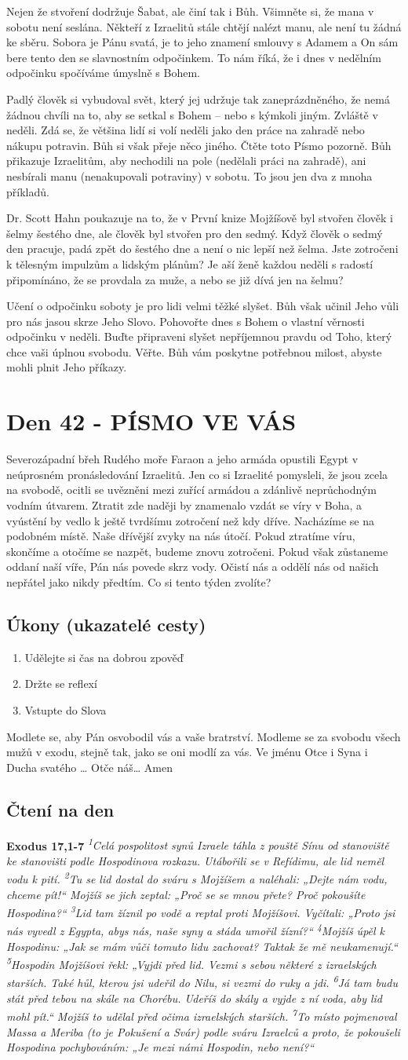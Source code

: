 \documentclass[11pt]{article}
\newcommand{\zacatekSestyTyden}{
  Severozápadní břeh Rudého moře \newline 
  Faraon a jeho armáda opustili Egypt v neúprosném pronásledování Izraelitů. Jen co si Izraelité pomysleli, že jsou zcela na svobodě, ocitli se uvězněni mezi zuřící armádou a zdánlivě neprůchodným vodním útvarem. Ztratit zde naději by znamenalo vzdát se víry v Boha, a vyústění by vedlo k ještě tvrdšímu zotročení než kdy dříve. Nacházíme se na podobném místě. Naše dřívější zvyky na nás útočí. Pokud ztratíme víru, skončíme a otočíme se nazpět, budeme znovu zotročeni. Pokud však zůstaneme oddaní naší víře, Pán nás povede skrz vody. Očistí nás a oddělí nás od našich nepřátel jako nikdy předtím. Co si tento týden zvolíte?

\subsection*{Úkony (ukazatelé cesty)}
\begin{enumerate}
  \item Udělejte si čas na dobrou zpověď
  \item Držte se reflexí
  \item Vstupte do Slova
\end{enumerate}
Modlete se, aby Pán osvobodil vás a vaše bratrství. \newline
Modleme se za svobodu všech mužů v exodu, stejně tak, jako se oni modlí za vás.\newline
Ve jménu Otce i Syna i Ducha svatého …  Otče náš… Amen
}
\begin{document}
Nejen že stvoření dodržuje Šabat, ale činí tak i Bůh. Všimněte si, že mana v sobotu není seslána. Někteří z Izraelitů
stále chtějí nalézt manu, ale není tu žádná ke sběru. Sobora je Pánu svatá, je to jeho znamení smlouvy s Adamem a On
sám bere tento den se slavnostním odpočinkem. To nám říká, že i dnes v nedělním odpočinku spočíváme úmyslně
s Bohem.

Padlý člověk si vybudoval svět, který jej udržuje tak zaneprázdněného, že nemá žádnou chvíli na to, aby se setkal
s Bohem – nebo s kýmkoli jiným. Zvláště v neděli. Zdá se, že většina lidí si volí neděli jako den práce na zahradě nebo
nákupu potravin. Bůh si však přeje něco jiného. Čtěte toto Písmo pozorně. Bůh přikazuje Izraelitům, aby nechodili na
pole (nedělali práci na zahradě), ani nesbírali manu (nenakupovali potraviny) v sobotu. To jsou jen dva z mnoha
příkladů.

Dr. Scott Hahn poukazuje na to, že v První knize Mojžíšově byl stvořen člověk i šelmy šestého dne, ale člověk byl
stvořen pro den sedmý. Když člověk o sedmý den pracuje, padá zpět do šestého dne a není o nic lepší než šelma. Jste
zotročeni k tělesným impulzům a lidským plánům? Je aší ženě každou neděli s radostí připomínáno, že se provdala za
muže, a nebo se již dívá jen na šelmu?

Učení o odpočinku soboty je pro lidi velmi těžké slyšet. Bůh však učinil Jeho vůli pro nás jasou skrze Jeho Slovo.
Pohovořte dnes s Bohem o vlastní věrnosti odpočinku v neděli. Buďte připraveni slyšet nepříjemnou pravdu od Toho,
který chce vaši úplnou svobodu. Věřte. Bůh vám poskytne potřebnou milost, abyste mohli plnit Jeho příkazy.


\newpage
\section{Den 42 - PÍSMO VE VÁS}
\zacatekSestyTyden
\subsection*{Čtení na den}
\textbf{Exodus 17,1-7}
\newline
\textit{
\textsuperscript{1}Celá pospolitost synů Izraele táhla z pouště Sínu od stanoviště ke stanovišti podle Hospodinova rozkazu. Utábořili se v Refídimu, ale lid neměl vodu k pití.
\textsuperscript{2}Tu se lid dostal do sváru s Mojžíšem a naléhali: „Dejte nám vodu, chceme pít!“ Mojžíš se jich zeptal: „Proč se se mnou přete? Proč pokoušíte Hospodina?“
\textsuperscript{3}Lid tam žíznil po vodě a reptal proti Mojžíšovi. Vyčítali: „Proto jsi nás vyvedl z Egypta, abys nás, naše syny a stáda umořil žízní?“
\textsuperscript{4}Mojžíš úpěl k Hospodinu: „Jak se mám vůči tomuto lidu zachovat? Taktak že mě neukamenují.“
\textsuperscript{5}Hospodin Mojžíšovi řekl: „Vyjdi před lid. Vezmi s sebou některé z izraelských starších. Také hůl, kterou jsi udeřil do Nilu, si vezmi do ruky a jdi.
\textsuperscript{6}Já tam budu stát před tebou na skále na Chorébu. Udeříš do skály a vyjde z ní voda, aby lid mohl pít.“ Mojžíš to udělal před očima izraelských starších.
\textsuperscript{7}To místo pojmenoval Massa a Meriba (to je Pokušení a Svár) podle sváru Izraelců a proto, že pokoušeli Hospodina pochybováním: „Je mezi námi Hospodin, nebo není?“
}
\end{document}
